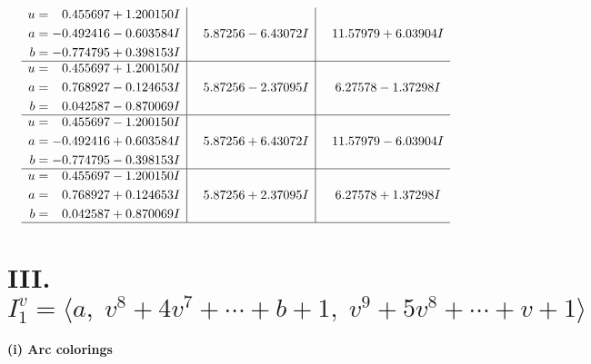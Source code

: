 \documentclass[1p]{elsarticle_modified}
\theoremstyle{definition}
\begin{document}
$$\begin{array}{c|c|c}
\begin{aligned}
u &= \phantom{-}0.455697 + 1.200150 I \\
a &= -0.492416 - 0.603584 I \\
b &= -0.774795 + 0.398153 I\end{aligned}
 & \phantom{-}5.87256 - 6.43072 I & \phantom{-}11.57979 + 6.03904 I \\ \hline\begin{aligned}
u &= \phantom{-}0.455697 + 1.200150 I \\
a &= \phantom{-}0.768927 - 0.124653 I \\
b &= \phantom{-}0.042587 - 0.870069 I\end{aligned}
 & \phantom{-}5.87256 - 2.37095 I & \phantom{-}6.27578 - 1.37298 I \\ \hline\begin{aligned}
u &= \phantom{-}0.455697 - 1.200150 I \\
a &= -0.492416 + 0.603584 I \\
b &= -0.774795 - 0.398153 I\end{aligned}
 & \phantom{-}5.87256 + 6.43072 I & \phantom{-}11.57979 - 6.03904 I \\ \hline\begin{aligned}
u &= \phantom{-}0.455697 - 1.200150 I \\
a &= \phantom{-}0.768927 + 0.124653 I \\
b &= \phantom{-}0.042587 + 0.870069 I\end{aligned}
 & \phantom{-}5.87256 + 2.37095 I & \phantom{-}6.27578 + 1.37298 I\\
 \hline 
 \end{array}$$\newpage\newpage\renewcommand{\arraystretch}{1}
\centering \section*{III. $I^v_{1}= \langle a,\;v^8+4 v^7+\cdots+b+1,\;v^9+5 v^8+\cdots+v+1 \rangle$}
\flushleft \textbf{(i) Arc colorings}\\
\end{document}
